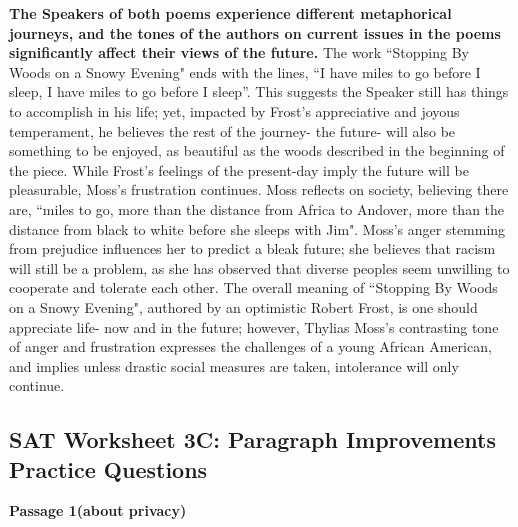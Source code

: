 \begin{enumerate}
\textbf{The Speakers of both poems experience different metaphorical journeys, and the tones of the authors on current issues in the poems significantly affect their views of the future.} The work “Stopping By Woods on a Snowy Evening" ends with the lines, ``I have miles to go before I sleep, I have miles to go before I sleep”. This suggests the Speaker still has things to accomplish in his life; yet, impacted by Frost's appreciative and joyous temperament, he believes the rest of the journey- the future- will also be something to be enjoyed, as beautiful as the woods described in the beginning of the piece. While Frost's feelings of the present-day imply the future will be pleasurable, Moss's frustration continues. Moss reflects on society, believing there are, ``miles to go, more than the distance from Africa to Andover, more than the distance from black to white before she sleeps with Jim". Moss's anger stemming from prejudice influences her to predict a bleak future; she believes that racism will still be a problem, as she has observed that diverse peoples seem unwilling to cooperate and tolerate each other. The overall meaning of ``Stopping By Woods on a Snowy Evening", authored by an optimistic Robert Frost, is one should appreciate life- now and in the future; however, Thylias Moss's contrasting tone of anger and frustration expresses the challenges of a young African American, and implies unless drastic social measures are taken, intolerance will only continue.        
\end{enumerate}





\subsection{SAT Worksheet 3C: Paragraph Improvements Practice Questions}

\textbf{Passage 1(about privacy)}

